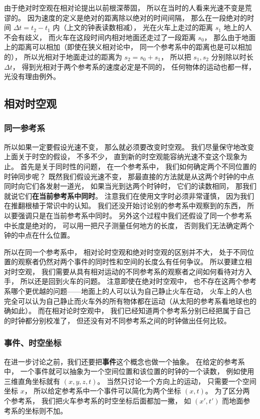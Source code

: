 由于绝对时空观在相对论提出以前根深蒂固， 所以在当时的人看来光速不变是荒谬的。 因为速度的定义是绝对的距离除以绝对的时间间隔， 那么在一段绝对的时间 $\Delta t = t_2 - t_1$ 内（上文的钟表读数相减）， 光在火车上走过的距离 $s_1$ 地上的人不会有歧义， 而火车在这段时间内相对地面还走过了一段距离 $s_0$， 那么由于地面上的距离可以相加（即使在狭义相对论中， 同一个参考系中的距离也是可以相加的）， 所以光相对于地面走过的距离为 $s_2 = s_0 + s_1$， 所以把 $s_1, s_2$ 分别除以时长 $\Delta t$， 得到光相对于两个参考系的速度必定是不同的， 任何物体的运动也都一样， 光没有理由例外。

\subsection{相对时空观}

\subsubsection{同一参考系}
所以如果一定要假设光速不变， 那么就必须要改变时空观。 我们尽量保守地改变上面关于时空的假设， 不多不少， 直到新的时空观能容纳光速不变这个现象为止。 首先是关于同时性的问题， 在一个参考系中， 我们如何确定两个不同位置的时钟同步呢？ 既然我们假设光速不变， 那最直接的方法就是从这两个时钟的中点同时向它们各发射一道光， 如果当光到达两个时钟时， 它们的读数相同， 那我们就说它们\textbf{在当前参考系中同时}。 注意我们在使用文字时必须非常谨慎， 因为我们在推翻根植于常识中的认知。 我们还没开始讨论别的参考系中观察到的东西， 所以要强调只是在当前参考系中同时。 另外这个过程中我们还假设了同一个参考系中长度是绝对的， 可以用一把尺子测量任何地方的长度， 否则我们无法确定两个钟的中点在什么位置。

所以在同一个参考系中， 相对论时空观和绝对时空观的区别并不大， 处于不同位置的观察者仍然对两个事件的同时性和空间的长度么有任何争议。 所以要建立相对时空观， 我们需要从具有相对运动的不同参考系的观察者之间如何看待对方入手， 所以还是回到火车的问题。 注意即使在绝对时空观中， 也不存在这两个参考系哪个更优越的问题——地面上的人可以认为自己静止火车在动， 火车上的人也完全可以认为自己静止而火车外的所有物体都在运动（从太阳的参考系看地球也的确如此）。 而在相对论时空观中， 我们已经知道两个参考系分别已经把属于自己的时钟都分别校准了， 但还没有对不同参考系之间的时钟做出任何比较。

\subsubsection{事件、时空坐标}
在进一步讨论之前，我们还要把\textbf{事件}这个概念也做一个抽象。 在给定的参考系中， 一个事件就可以抽象为一个空间位置和该位置的时钟的一个读数， 例如使用三维直角坐标就有 $(x, y, z, t)$。 当然只讨论一个方向上的运动， 只需要一个空间坐标 $x$， 所以给定参考系中一个事件可以简化为两个坐标 $(x, t)$。 为了区分两个参考系， 我们把火车参考系的时空坐标后面都加一撇， 如 $(x', t')$ 而地面参考系的坐标则不加。

